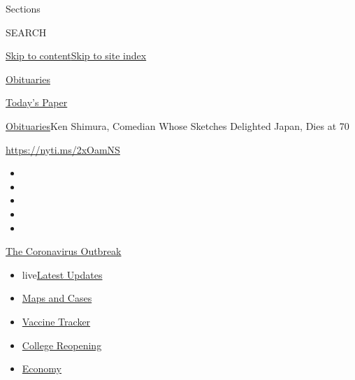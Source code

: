 Sections

SEARCH

\protect\hyperlink{site-content}{Skip to
content}\protect\hyperlink{site-index}{Skip to site index}

\href{https://www.nytimes3xbfgragh.onion/section/obituaries}{Obituaries}

\href{https://myaccount.nytimes3xbfgragh.onion/auth/login?response_type=cookie\&client_id=vi}{}

\href{https://www.nytimes3xbfgragh.onion/section/todayspaper}{Today's
Paper}

\href{/section/obituaries}{Obituaries}\textbar{}Ken Shimura, Comedian
Whose Sketches Delighted Japan, Dies at 70

\url{https://nyti.ms/2xOamNS}

\begin{itemize}
\item
\item
\item
\item
\item
\end{itemize}

\href{https://www.nytimes3xbfgragh.onion/news-event/coronavirus?action=click\&pgtype=Article\&state=default\&region=TOP_BANNER\&context=storylines_menu}{The
Coronavirus Outbreak}

\begin{itemize}
\tightlist
\item
  live\href{https://www.nytimes3xbfgragh.onion/2020/08/04/world/coronavirus-covid-19.html?action=click\&pgtype=Article\&state=default\&region=TOP_BANNER\&context=storylines_menu}{Latest
  Updates}
\item
  \href{https://www.nytimes3xbfgragh.onion/interactive/2020/us/coronavirus-us-cases.html?action=click\&pgtype=Article\&state=default\&region=TOP_BANNER\&context=storylines_menu}{Maps
  and Cases}
\item
  \href{https://www.nytimes3xbfgragh.onion/interactive/2020/science/coronavirus-vaccine-tracker.html?action=click\&pgtype=Article\&state=default\&region=TOP_BANNER\&context=storylines_menu}{Vaccine
  Tracker}
\item
  \href{https://www.nytimes3xbfgragh.onion/2020/08/02/us/covid-college-reopening.html?action=click\&pgtype=Article\&state=default\&region=TOP_BANNER\&context=storylines_menu}{College
  Reopening}
\item
  \href{https://www.nytimes3xbfgragh.onion/live/2020/08/03/business/stock-market-today-coronavirus?action=click\&pgtype=Article\&state=default\&region=TOP_BANNER\&context=storylines_menu}{Economy}
\end{itemize}

